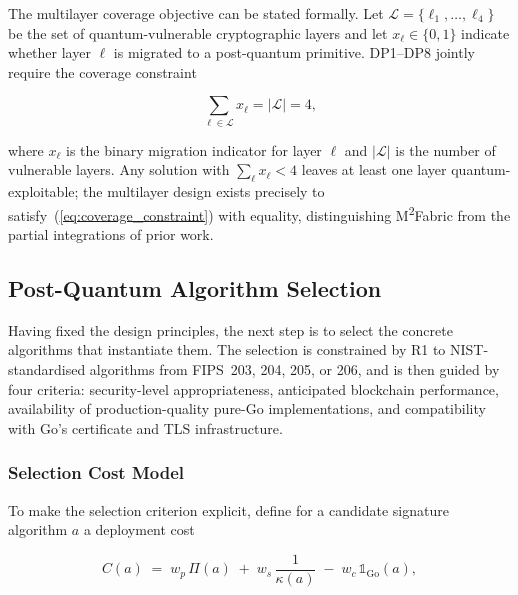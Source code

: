 \documentclass{ieeetj}
\newcommand{\mfabric}{M\textsuperscript{2}Fabric}
\begin{document}
The multilayer coverage objective can be stated formally. Let
$\mathcal{L}=\{\ell_1,\dots,\ell_4\}$ be the set of quantum-vulnerable
cryptographic layers and let $x_{\ell}\in\{0,1\}$ indicate whether layer $\ell$
is migrated to a post-quantum primitive. DP1--DP8 jointly require the coverage
constraint

\begin{equation}
\sum_{\ell\in\mathcal{L}} x_{\ell} = |\mathcal{L}| = 4 ,
\label{eq:coverage_constraint}
\end{equation}

where $x_{\ell}$ is the binary migration indicator for layer $\ell$ and
$|\mathcal{L}|$ is the number of vulnerable layers. Any solution with
$\sum_{\ell} x_{\ell}<4$ leaves at least one layer quantum-exploitable; the
multilayer design exists precisely to satisfy~(\ref{eq:coverage_constraint})
with equality, distinguishing \mfabric{} from the partial integrations of prior
work.

\subsection{Post-Quantum Algorithm Selection}
\label{sec:method_alg}

Having fixed the design principles, the next step is to select the concrete
algorithms that instantiate them. The selection is constrained by R1 to
NIST-standardised algorithms from FIPS~203, 204, 205, or 206, and is then guided
by four criteria: security-level appropriateness, anticipated blockchain
performance, availability of production-quality pure-Go implementations, and
compatibility with Go's certificate and TLS infrastructure.

\subsubsection{Selection Cost Model}

To make the selection criterion explicit, define for a candidate signature
algorithm $a$ a deployment cost

\begin{equation}
C(a) \;=\; w_{p}\,\Pi(a) \;+\; w_{s}\,\frac{1}{\kappa(a)} \;-\; w_{c}\,\mathbb{1}_{\mathrm{Go}}(a),
\label{eq:selection_cost}
\end{equation}
\end{document}
